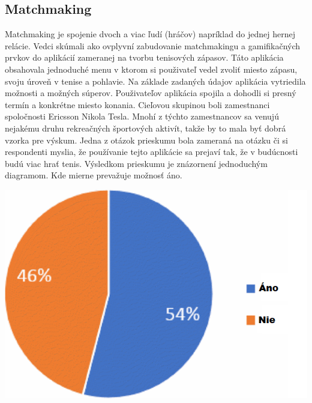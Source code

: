 \documentclass[10pt,twoside,slovak,a4paper]{article}
\begin{document}
\subsection{Matchmaking} \label{Matchmaking}
Matchmaking je spojenie dvoch a viac ľudí (hráčov) napríklad do jednej hernej relácie. Vedci skúmali ako ovplyvní zabudovanie matchmakingu a gamifikačných prvkov do aplikácií zameranej na tvorbu tenisových zápasov. Táto aplikácia obsahovala jednoduché menu v ktorom si použivateľ vedel zvoliť miesto zápasu, svoju úroveň v tenise a pohlavie. Na základe zadaných údajov aplikácia vytriedila možnosti a možných súperov. Použivateľov aplikácia spojila a dohodli si presný termín a konkrétne miesto konania.
Cieľovou skupinou boli zamestnanci spoločnosti Ericsson Nikola Tesla. Mnohí z týchto zamestnancov sa venujú nejakému druhu rekreačných športových aktivít, takže by to mala byť dobrá vzorka pre výskum. 
\newpage
Jedna z otázok prieskumu bola zameraná na otázku či si respondenti myslia, že používanie tejto aplikácie sa prejaví tak, že v budúcnosti budú viac hrať tenis. \cite{Improving_motivation-Framework} Výsledkom prieskumu je znázornení jednoduchým diagramom. Kde mierne prevažuje možnosť áno. 

\hfill \break 
\includegraphics[scale =0.6]{graf_tenis.png}
\end{document}
